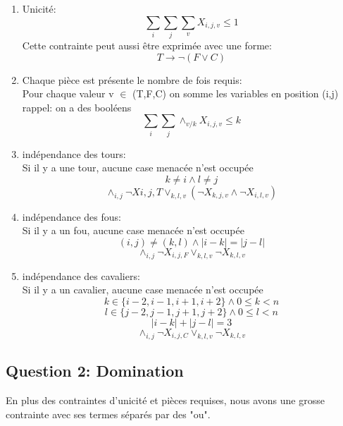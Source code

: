 \begin{enumerate}
    \item Unicité:
    \[ \sum_{i} \sum_{j} \sum_{v} X_{i,j,v}  \leq 1 \]
    Cette contrainte peut aussi être exprimée avec une forme: \[ T \longrightarrow \neg ( F \lor C ) \]
    
    \item Chaque pièce est présente le nombre de fois requis:\\
    Pour chaque valeur v $\in$ (T,F,C) on somme les variables en position (i,j) \\ rappel: on a des booléens
    \[\sum_{i} \sum_{j} \land_{v / k}   X_{i,j,v}  \leq k \]
    
    \item indépendance des tours:\\
    Si il y a une tour, aucune case menacée n'est occupée
    \[ k \neq i \land l \neq j \]
    \[ \land_{i,j} \neg Xi,j,T \lor_{k,l,v} ( \neg X_{k,j,v} \land \neg X_{i,l,v} ) \]
    
    \item indépendance des fous:\\
    Si il y a un fou, aucune case menacée n'est occupée\\
    \[ (i,j) \neq (k,l) \land |i-k| = |j-l| \]
    \[ \land_{i,j} \neg X_{i,j,F} \lor_{k,l,v} \neg X_{k,l,v}  \]
    
    \item indépendance des cavaliers:\\
    Si il y a un cavalier, aucune case menacée n'est occupée\\
    \[  k \in \{i-2, i-1, i+1, i+2\} \land 0 \leq k < n \]
    \[  l \in \{j-2, j-1, j+1, j+2\} \land 0 \leq l < n \]
    \[  |i-k| + |j-l| = 3 \]
    \[ \land_{i,j} \neg X_{i,j,C} \lor_{k,l,v} \neg X_{k,l,v}  \]
\end{enumerate}



\subsection{Question 2: Domination}
En plus des contraintes d'unicité et pièces requises, nous avons une grosse contrainte avec ses termes séparés par des "ou".

